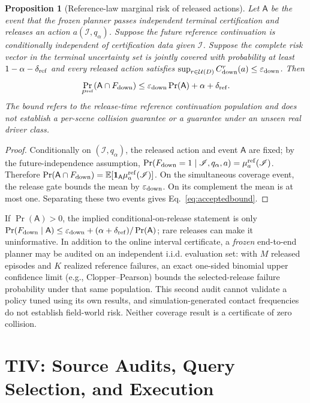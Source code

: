 \documentclass[10pt]{article}
\newtheorem{proposition}{Proposition}\newtheorem{assumption}{Assumption}\newtheorem{remark}{Remark}
\begin{document}
\begin{proposition}[Reference-law marginal risk of released actions]\label{prop:gate}
Let $\mathsf A$ be the event that the frozen planner passes independent terminal certification and releases an action $a(\mathscr I,q_\alpha)$. Suppose the future reference continuation is conditionally independent of certification data given $\mathscr I$. Suppose the complete risk vector in the terminal uncertainty set is jointly covered with probability at least $1-\alpha-\delta_{\rm ref}$ and every released action satisfies $\sup_{r\in\mathcal U(D)}C_{\rm down}^r(a)\le\varepsilon_{\rm down}$. Then
\begin{equation}
 \Pr_{P^{\rm ref}}(\mathsf A\cap F_{\rm down})
 \le\varepsilon_{\rm down}\Pr(\mathsf A)+\alpha+\delta_{\rm ref}.
 \label{eq:acceptedbound}
\end{equation}
The bound refers to the release-time reference continuation population and does not establish a per-scene collision guarantee or a guarantee under an unseen real driver class.
\end{proposition}
\begin{proof}
Conditionally on $(\mathscr I,q_\alpha)$, the released action and event $\mathsf A$ are fixed; by the future-independence assumption, $\Pr(F_{\rm down}=1\mid\mathscr I,q_\alpha,a)=\mu_a^{\rm ref}(\mathscr I)$. Therefore $\Pr(\mathsf A\cap F_{\rm down})=\mathbb E[\mathbf1_{\mathsf A}\mu_a^{\rm ref}(\mathscr I)]$. On the simultaneous coverage event, the release gate bounds the mean by $\varepsilon_{\rm down}$. On its complement the mean is at most one. Separating these two events gives Eq.~\eqref{eq:acceptedbound}.
\end{proof}
If $\Pr(\mathsf A)>0$, the implied conditional-on-release statement is only $\Pr(F_{\rm down}\mid\mathsf A)\le\varepsilon_{\rm down}+(\alpha+\delta_{\rm ref})/\Pr(\mathsf A)$; rare releases can make it uninformative. In addition to the online interval certificate, a \emph{frozen} end-to-end planner may be audited on an independent i.i.d. evaluation set: with $M$ released episodes and $K$ realized reference failures, an exact one-sided binomial upper confidence limit (e.g., Clopper--Pearson) bounds the selected-release failure probability under that same population. This second audit cannot validate a policy tuned using its own results, and simulation-generated contact frequencies do not establish field-world risk. Neither coverage result is a certificate of zero collision.

\section{TIV: Source Audits, Query Selection, and Execution}
\label{app:queryimpl}
\end{document}
